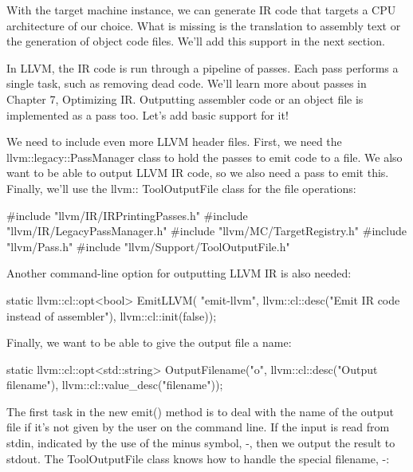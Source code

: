 With the target machine instance, we can generate IR code that targets a CPU architecture of our choice. What is missing is the translation to assembly text or the generation of object code files. We’ll add this support in the next section.


In LLVM, the IR code is run through a pipeline of passes. Each pass performs a single task, such as removing dead code. We’ll learn more about passes in Chapter 7, Optimizing IR. Outputting assembler code or an object file is implemented as a pass too. Let’s add basic support for it!

We need to include even more LLVM header files. First, we need the llvm::legacy::PassManager class to hold the passes to emit code to a file. We also want to be able to output LLVM IR code, so we also need a pass to emit this. Finally, we’ll use the llvm:: ToolOutputFile class for the file operations:

\begin{cpp}
#include "llvm/IR/IRPrintingPasses.h"
#include "llvm/IR/LegacyPassManager.h"
#include "llvm/MC/TargetRegistry.h"
#include "llvm/Pass.h"
#include "llvm/Support/ToolOutputFile.h"
\end{cpp}

Another command-line option for outputting LLVM IR is also needed:

\begin{cpp}
static llvm::cl::opt<bool> EmitLLVM(
    "emit-llvm",
    llvm::cl::desc("Emit IR code instead of assembler"),
    llvm::cl::init(false));
\end{cpp}

Finally, we want to be able to give the output file a name:

\begin{cpp}
static llvm::cl::opt<std::string>
    OutputFilename("o",
                   llvm::cl::desc("Output filename"),
                   llvm::cl::value_desc("filename"));
\end{cpp}

The first task in the new emit() method is to deal with the name of the output file if it’s not given by the user on the command line. If the input is read from stdin, indicated by the use of the minus symbol, -, then we output the result to stdout. The ToolOutputFile class knows how to handle the special filename, -:

\begin{cpp}
bool emit(StringRef Argv0, llvm::Module *M,
          llvm::TargetMachine *TM,
          StringRef InputFilename) {
    CodeGenFileType FileType = codegen::getFileType();
    if (OutputFilename.empty()) {
        if (InputFilename == "-") {
            OutputFilename = "-";
        }
\end{cpp}

